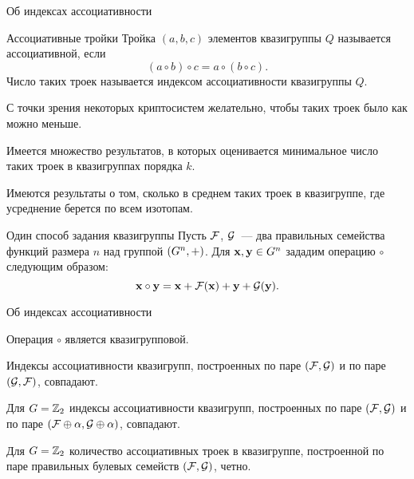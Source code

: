 \begin{frame}{Об индексах ассоциативности}
    \begin{myexample}{Ассоциативные тройки}
        Тройка $(a,b,c)$ элементов квазигруппы $Q$ называется ассоциативной, если
        \[
            (a \circ b) \circ c = a \circ (b \circ c). 
        \]
        Число таких троек называется индексом ассоциативности квазигруппы $Q$.
    \end{myexample}

    \begin{coloritemize}
        \item С точки зрения некоторых криптосистем желательно, чтобы таких троек было как можно меньше.
        \item Имеется множество результатов, в которых оценивается минимальное число таких троек в квазигруппах порядка $k$.
        \item Имеются результаты о том, сколько в среднем таких троек в квазигруппе, где усреднение берется по всем изотопам.
    \end{coloritemize}
\end{frame}


\begin{frame}{Один способ задания квазигруппы}
    Пусть $\mathcal{F}$, $\mathcal{G}$~--- два правильных семейства функций размера $n$ над группой $(G^n, +)$.
    Для $\mathbf{x}, \mathbf{y} \in G^n$ зададим операцию $\circ$ следующим образом:
    \[
        \mathbf{x} \circ \mathbf{y} = \mathbf{x} + \mathcal{F}(\mathbf{x}) + \mathbf{y} + \mathcal{G}(\mathbf{y}).
    \]
    \begin{mytheorem}{Об индексах ассоциативности}
        \begin{coloritemize}
            \item Операция $\circ$ является квазигрупповой.
            \item Индексы ассоциативности квазигрупп, построенных по паре $(\mathcal{F}, \mathcal{G})$ и по паре $(\mathcal{G}, \mathcal{F})$, совпадают.
            \item Для $G = \mathbb{Z}_2$ индексы ассоциативности квазигрупп, построенных по паре $(\mathcal{F}, \mathcal{G})$ и по паре $(\mathcal{F} \oplus \alpha, \mathcal{G} \oplus \alpha)$, совпадают.
            \item Для $G = \mathbb{Z}_2$ количество ассоциативных троек в квазигруппе, построенной по паре правильных булевых семейств $(\mathcal{F}, \mathcal{G})$, четно.
        \end{coloritemize}
    \end{mytheorem}
\end{frame}


